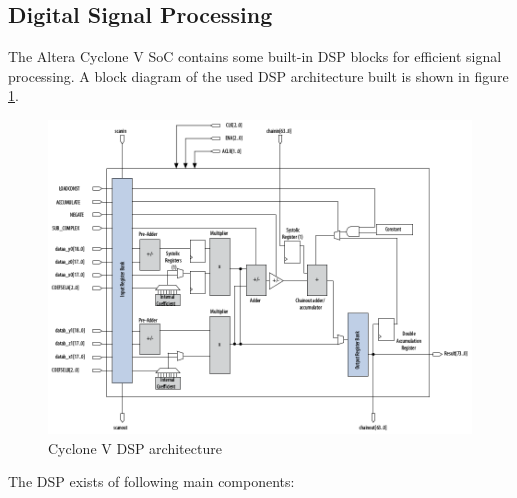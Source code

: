 \subsection{Digital Signal Processing}
The Altera Cyclone V SoC contains some built-in DSP blocks for efficient signal processing. A block diagram of the used DSP architecture built is shown in figure \ref{fig:fpgadsp}.
\begin{figure}[htbp]
\begin{center}
\includegraphics[width=15cm,keepaspectratio=true]{bilder/png/fpgadsp}
\caption{Cyclone V DSP architecture\cite[chapter 3]{AlteraFPGA15}}
\label{fig:fpgadsp}
\end{center}
\end{figure}
The DSP exists of following main components:
